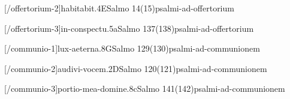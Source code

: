 \AllowPageFlush

[\Prefix/offertorium-2]{habitabit.4E}{Salmo 14(15)}{psalmi-ad-offertorium}

\AllowPageFlush

[\Prefix/offertorium-3]{in-conspectu.5a}{Salmo 137(138)}{psalmi-ad-offertorium}

\AllowPageBreak

[\Prefix/communio-1]{lux-aeterna.8G}{Salmo 129(130)}{psalmi-ad-communionem}

\AllowPageFlush

[\Prefix/communio-2]{audivi-vocem.2D}{Salmo 120(121)}{psalmi-ad-communionem}

\AllowPageFlush

[\Prefix/communio-3]{portio-mea-domine.8c}{Salmo 141(142)}{psalmi-ad-communionem}